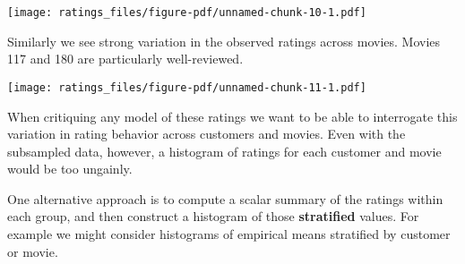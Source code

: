 \documentclass[
  letterpaper,
  DIV=11,
  numbers=noendperiod]{scrartcl}
\newenvironment{Shaded}{\begin{snugshade}}{\end{snugshade}}
\newcommand{\AttributeTok}[1]{\textcolor[rgb]{0.40,0.45,0.13}{#1}}
\newcommand{\ControlFlowTok}[1]{\textcolor[rgb]{0.00,0.23,0.31}{#1}}
\newcommand{\DecValTok}[1]{\textcolor[rgb]{0.68,0.00,0.00}{#1}}
\newcommand{\FloatTok}[1]{\textcolor[rgb]{0.68,0.00,0.00}{#1}}
\newcommand{\FunctionTok}[1]{\textcolor[rgb]{0.28,0.35,0.67}{#1}}
\newcommand{\NormalTok}[1]{\textcolor[rgb]{0.00,0.23,0.31}{#1}}
\newcommand{\SpecialCharTok}[1]{\textcolor[rgb]{0.37,0.37,0.37}{#1}}
\newcommand{\StringTok}[1]{\textcolor[rgb]{0.13,0.47,0.30}{#1}}
\begin{document}
\texttt{[image: ratings\_files/figure-pdf/unnamed-chunk-10-1.pdf]}

Similarly we see strong variation in the observed ratings across movies.
Movies 117 and 180 are particularly well-reviewed.

\begin{Shaded}
\end{Shaded}

\texttt{[image: ratings\_files/figure-pdf/unnamed-chunk-11-1.pdf]}

When critiquing any model of these ratings we want to be able to
interrogate this variation in rating behavior across customers and
movies. Even with the subsampled data, however, a histogram of ratings
for each customer and movie would be too ungainly.

One alternative approach is to compute a scalar summary of the ratings
within each group, and then construct a histogram of those
\textbf{stratified} values. For example we might consider histograms of
empirical means stratified by customer or movie.
\end{document}
